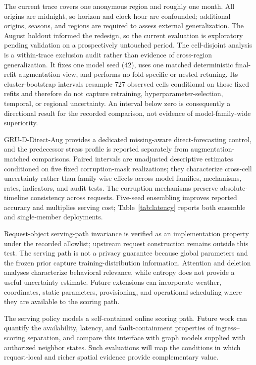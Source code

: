 \documentclass[10pt,conference,letterpaper]{IEEEtran}
\begin{document}
The current trace covers one anonymous region and roughly one month. All origins are midnight, so horizon and clock hour are confounded; additional origins, seasons, and regions are required to assess external generalization. The August holdout informed the redesign, so the current evaluation is exploratory pending validation on a prospectively untouched period. The cell-disjoint analysis is a within-trace exclusion audit rather than evidence of cross-region generalization. It fixes one model seed (42), uses one matched deterministic final-refit augmentation view, and performs no fold-specific or nested retuning. Its cluster-bootstrap intervals resample 727 observed cells conditional on those fixed refits and therefore do not capture retraining, hyperparameter-selection, temporal, or regional uncertainty. An interval below zero is consequently a directional result for the recorded comparison, not evidence of model-family-wide superiority.

GRU-D-Direct-Aug provides a dedicated missing-aware direct-forecasting control, and the predecessor stress profile is reported separately from augmentation-matched comparisons. Paired intervals are unadjusted descriptive estimates conditioned on five fixed corruption-mask realizations; they characterize cross-cell uncertainty rather than family-wise effects across model families, mechanisms, rates, indicators, and audit tests. The corruption mechanisms preserve absolute-timeline consistency across requests. Five-seed ensembling improves reported accuracy and multiplies serving cost; Table~\ref{tab:latency} reports both ensemble and single-member deployments.

Request-object serving-path invariance is verified as an implementation property under the recorded allowlist; upstream request construction remains outside this test. The serving path is not a privacy guarantee because global parameters and the frozen prior capture training-distribution information. Attention and deletion analyses characterize behavioral relevance, while entropy does not provide a useful uncertainty estimate. Future extensions can incorporate weather, coordinates, static parameters, provisioning, and operational scheduling where they are available to the scoring path.

The serving policy models a self-contained online scoring path. Future work can quantify the availability, latency, and fault-containment properties of ingress--scoring separation, and compare this interface with graph models supplied with authorized neighbor states. Such evaluations will map the conditions in which request-local and richer spatial evidence provide complementary value.
\end{document}
